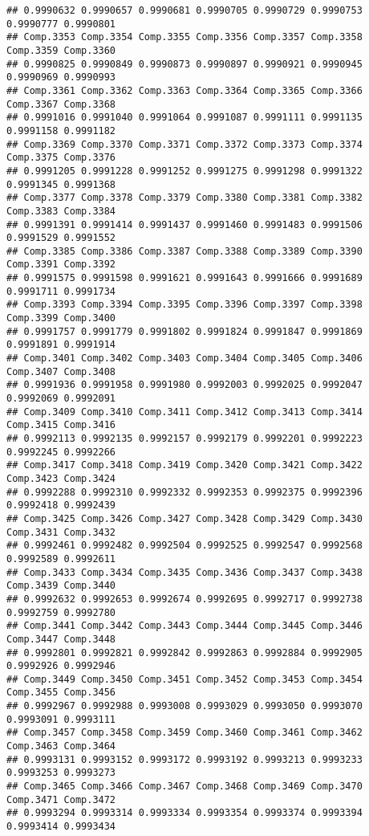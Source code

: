 \documentclass[
]{article}
\begin{document}
\begin{verbatim}
## 0.9990632 0.9990657 0.9990681 0.9990705 0.9990729 0.9990753 0.9990777 0.9990801 
## Comp.3353 Comp.3354 Comp.3355 Comp.3356 Comp.3357 Comp.3358 Comp.3359 Comp.3360 
## 0.9990825 0.9990849 0.9990873 0.9990897 0.9990921 0.9990945 0.9990969 0.9990993 
## Comp.3361 Comp.3362 Comp.3363 Comp.3364 Comp.3365 Comp.3366 Comp.3367 Comp.3368 
## 0.9991016 0.9991040 0.9991064 0.9991087 0.9991111 0.9991135 0.9991158 0.9991182 
## Comp.3369 Comp.3370 Comp.3371 Comp.3372 Comp.3373 Comp.3374 Comp.3375 Comp.3376 
## 0.9991205 0.9991228 0.9991252 0.9991275 0.9991298 0.9991322 0.9991345 0.9991368 
## Comp.3377 Comp.3378 Comp.3379 Comp.3380 Comp.3381 Comp.3382 Comp.3383 Comp.3384 
## 0.9991391 0.9991414 0.9991437 0.9991460 0.9991483 0.9991506 0.9991529 0.9991552 
## Comp.3385 Comp.3386 Comp.3387 Comp.3388 Comp.3389 Comp.3390 Comp.3391 Comp.3392 
## 0.9991575 0.9991598 0.9991621 0.9991643 0.9991666 0.9991689 0.9991711 0.9991734 
## Comp.3393 Comp.3394 Comp.3395 Comp.3396 Comp.3397 Comp.3398 Comp.3399 Comp.3400 
## 0.9991757 0.9991779 0.9991802 0.9991824 0.9991847 0.9991869 0.9991891 0.9991914 
## Comp.3401 Comp.3402 Comp.3403 Comp.3404 Comp.3405 Comp.3406 Comp.3407 Comp.3408 
## 0.9991936 0.9991958 0.9991980 0.9992003 0.9992025 0.9992047 0.9992069 0.9992091 
## Comp.3409 Comp.3410 Comp.3411 Comp.3412 Comp.3413 Comp.3414 Comp.3415 Comp.3416 
## 0.9992113 0.9992135 0.9992157 0.9992179 0.9992201 0.9992223 0.9992245 0.9992266 
## Comp.3417 Comp.3418 Comp.3419 Comp.3420 Comp.3421 Comp.3422 Comp.3423 Comp.3424 
## 0.9992288 0.9992310 0.9992332 0.9992353 0.9992375 0.9992396 0.9992418 0.9992439 
## Comp.3425 Comp.3426 Comp.3427 Comp.3428 Comp.3429 Comp.3430 Comp.3431 Comp.3432 
## 0.9992461 0.9992482 0.9992504 0.9992525 0.9992547 0.9992568 0.9992589 0.9992611 
## Comp.3433 Comp.3434 Comp.3435 Comp.3436 Comp.3437 Comp.3438 Comp.3439 Comp.3440 
## 0.9992632 0.9992653 0.9992674 0.9992695 0.9992717 0.9992738 0.9992759 0.9992780 
## Comp.3441 Comp.3442 Comp.3443 Comp.3444 Comp.3445 Comp.3446 Comp.3447 Comp.3448 
## 0.9992801 0.9992821 0.9992842 0.9992863 0.9992884 0.9992905 0.9992926 0.9992946 
## Comp.3449 Comp.3450 Comp.3451 Comp.3452 Comp.3453 Comp.3454 Comp.3455 Comp.3456 
## 0.9992967 0.9992988 0.9993008 0.9993029 0.9993050 0.9993070 0.9993091 0.9993111 
## Comp.3457 Comp.3458 Comp.3459 Comp.3460 Comp.3461 Comp.3462 Comp.3463 Comp.3464 
## 0.9993131 0.9993152 0.9993172 0.9993192 0.9993213 0.9993233 0.9993253 0.9993273 
## Comp.3465 Comp.3466 Comp.3467 Comp.3468 Comp.3469 Comp.3470 Comp.3471 Comp.3472 
## 0.9993294 0.9993314 0.9993334 0.9993354 0.9993374 0.9993394 0.9993414 0.9993434 

\end{verbatim}
\end{document}
